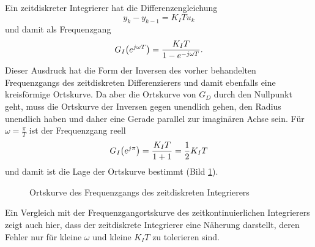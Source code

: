 Ein zeitdiskreter Integrierer hat die Differenzengleichung
\begin{equation}
	y_k - y_{k - 1} = K_I Tu_k
\end{equation}
und damit als Frequenzgang
\begin{equation}
	G_I\parentheses*{e^{j\omega T}} = \frac{K_I T}{1 - e^{-j\omega T}}.
\end{equation}
Dieser Ausdruck hat die Form der Inversen des vorher behandelten Frequenzgangs des zeitdiskreten Differenzierers und damit ebenfalls eine kreisförmige Ortskurve.
Da aber die Ortskurve von \(G_D\) durch den Nullpunkt geht, muss die Ortskurve der Inversen gegen unendlich gehen, den Radius unendlich haben und daher eine Gerade parallel zur imaginären Achse sein.
Für \(\omega = \frac{\pi}{T}\) ist der Frequenzgang reell
\begin{equation}
	G_I\parentheses*{e^{j\pi}} = \frac{K_I T}{1 + 1} = \frac{1}{2}K_I T
\end{equation}
und damit ist die Lage der Ortskurve bestimmt (Bild \ref{fig:6-7}).
\begin{figure}[ht]
	\centering
	\caption{Ortskurve des Frequenzgangs des zeitdiskreten Integrierers}
	\label{fig:6-7}
\end{figure}
Ein Vergleich mit der Frequenzgangortskurve des zeitkontinuierlichen Integrierers zeigt auch hier, dass der zeitdiskrete Integrierer eine Näherung darstellt, deren Fehler nur für kleine \(\omega\) und kleine \(K_I T\) zu tolerieren sind.

